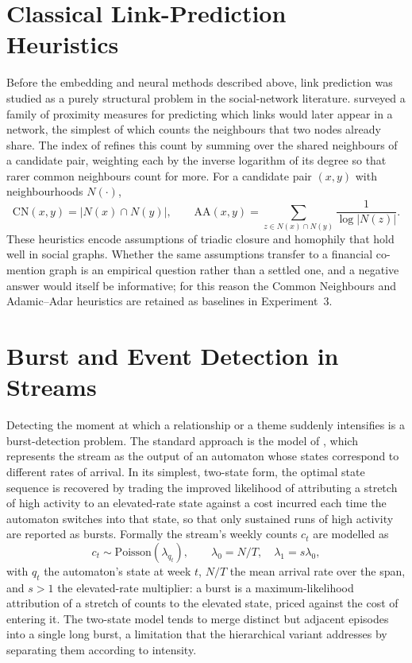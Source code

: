 \documentclass[a4paper,12pt]{report}
\begin{document}
\section{Classical Link-Prediction Heuristics}
Before the embedding and neural methods described above, link prediction was
studied as a purely structural problem in the social-network literature.
\citet{LibenNowell2007} surveyed a family of proximity measures for predicting
which links would later appear in a network, the simplest of which counts the
neighbours that two nodes already share. The index of \citet{AdamicAdar2003}
refines this count by summing over the shared neighbours of a candidate pair,
weighting each by the inverse logarithm of its degree so that rarer common
neighbours count for more. For a candidate pair $(x, y)$ with
neighbourhoods $N(\cdot)$,
\begin{equation}
\mathrm{CN}(x, y) = |N(x) \cap N(y)|, \qquad
\mathrm{AA}(x, y) = \sum_{z \in N(x) \cap N(y)} \frac{1}{\log |N(z)|}.
\label{eq:heuristics}
\end{equation} These heuristics encode assumptions of triadic closure
and homophily that hold well in social graphs. Whether the same assumptions
transfer to a financial co-mention graph is an empirical question rather than a
settled one, and a negative answer would itself be informative; for this reason
the Common Neighbours and Adamic--Adar heuristics are retained as baselines in
Experiment~3.

\section{Burst and Event Detection in Streams}
Detecting the moment at which a relationship or a theme suddenly intensifies is a
burst-detection problem. The standard approach is the model of
\citet{Kleinberg2003Bursty}, which represents the stream as the output of an
automaton whose states correspond to different rates of arrival. In its simplest,
two-state form, the optimal state sequence is recovered by trading the improved
likelihood of attributing a stretch of high activity to an elevated-rate state
against a cost incurred each time the automaton switches into that state, so that
only sustained runs of high activity are reported as bursts. Formally
the stream's weekly counts $c_t$ are modelled as
\begin{equation}
c_t \sim \mathrm{Poisson}(\lambda_{q_t}), \qquad \lambda_0 = N/T, \quad
\lambda_1 = s \lambda_0,
\label{eq:burstmodel}
\end{equation}
with $q_t$ the automaton's state at week $t$, $N/T$ the mean arrival
rate over the span, and $s > 1$ the elevated-rate multiplier: a burst is
a maximum-likelihood attribution of a stretch of counts to the elevated
state, priced against the cost of entering it. The two-state model
tends to merge distinct but adjacent episodes into a single long burst, a
limitation that the hierarchical variant addresses by separating them according
to intensity.
\end{document}
